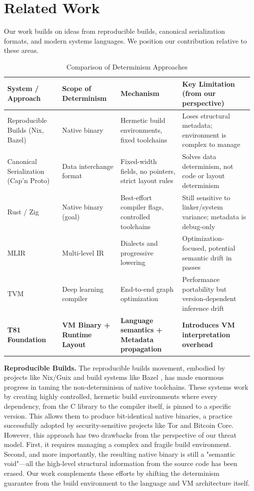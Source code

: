 \documentclass[sigconf, 10pt]{acmart}
\begin{document}
\section{Related Work}
Our work builds on ideas from reproducible builds, canonical serialization formats, and modern systems languages. We position our contribution relative to these areas.
\begin{table}[t]
\centering
\caption{Comparison of Determinism Approaches}
\label{tab:related_work_table}
\begin{tabular}{|l|l|l|l|}
\hline
\textbf{System / Approach} & \textbf{Scope of Determinism} & \textbf{Mechanism} & \textbf{Key Limitation (from our perspective)} \\
\hline
Reproducible Builds (Nix, Bazel) & Native binary & Hermetic build environments, fixed toolchains & Loses structural metadata; environment is complex to manage \\
Canonical Serialization (Cap'n Proto) & Data interchange format & Fixed-width fields, no pointers, strict layout rules & Solves data determinism, not code or layout determinism \\
Rust / Zig & Native binary (goal) & Best-effort compiler flags, controlled toolchains & Still sensitive to linker/system variance; metadata is debug-only \\
MLIR & Multi-level IR & Dialects and progressive lowering & Optimization-focused, potential semantic drift in passes \\
TVM & Deep learning compiler & End-to-end graph optimization & Performance portability but version-dependent inference drift \\
\textbf{T81 Foundation} & \textbf{VM Binary + Runtime Layout} & \textbf{Language semantics + Metadata propagation} & \textbf{Introduces VM interpretation overhead} \\
\hline
\end{tabular}
\end{table}
\textbf{Reproducible Builds.} The reproducible builds movement, embodied by projects like Nix/Guix \cite{nix} and build systems like Bazel \cite{bazel}, has made enormous progress in taming the non-determinism of native toolchains. These systems work by creating highly controlled, hermetic build environments where every dependency, from the C library to the compiler itself, is pinned to a specific version. This allows them to produce bit-identical native binaries, a practice successfully adopted by security-sensitive projects like Tor and Bitcoin Core. However, this approach has two drawbacks from the perspective of our threat model. First, it requires managing a complex and fragile build environment. Second, and more importantly, the resulting native binary is still a "semantic void"---all the high-level structural information from the source code has been erased. Our work complements these efforts by shifting the determinism guarantee from the build environment to the language and VM architecture itself.
\end{document}
